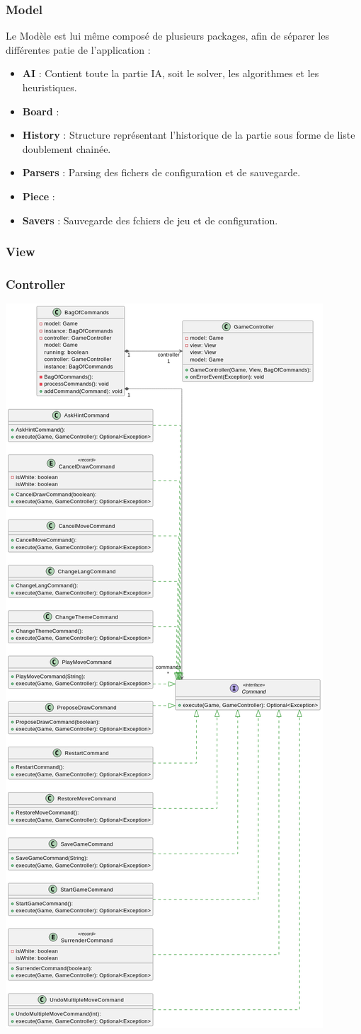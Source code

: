 \documentclass{article}
\begin{document}
\subsubsection{Model}
Le Modèle est lui même composé de plusieurs packages, afin de séparer les différentes patie de l'application :

\begin{itemize}
    \item \textbf{AI} : Contient toute la partie IA, soit le solver, les algorithmes et les heuristiques.
    \item \textbf{Board} : 
    \item \textbf{History} : Structure représentant l'historique de la partie sous forme de liste doublement chainée.
    \item \textbf{Parsers} : Parsing des fichers de configuration et de sauvegarde.
    \item \textbf{Piece} : 
    \item \textbf{Savers} : Sauvegarde des fchiers de jeu et de configuration.
\end{itemize}

\subsubsection{View}


\subsubsection{Controller}

\begin{center}
    \includegraphics[height=\textwidth]{uml_controller}
\end{center}
\end{document}
